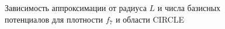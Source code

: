 \documentclass[a4paper, 12pt]{article}
\begin{document}
                  \begin{figure}[h!]
                    \noindent{}
                    \caption{Зависимость аппроксимации от радиуса $L$ и числа базисных потенциалов для плотности $f_7$ и области CIRCLE}
                    \label{nolnol}
                    \end{figure} 
\end{document}
